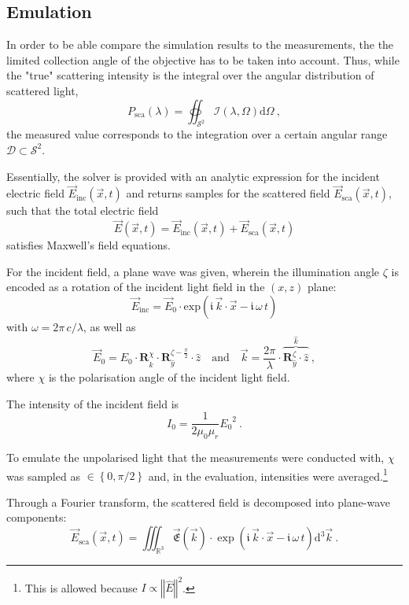 \documentclass[10pt]{article}
\begin{document}
\begin{multicols}{2}
\subsection*{Emulation}

In order to be able compare the simulation results to the measurements, the the limited collection angle of the objective has to be taken into account. 
Thus, while the "true" scattering intensity is the integral over the angular distribution of scattered light, 
$$
    P_\mathrm{sca}(\lambda) = \oiint_{\mathcal{S}^2} \mathcal{I}(\lambda, \Omega) \mathrm{d}\Omega \ ,
$$
the measured value corresponds to the integration over a certain angular range $\mathcal{D} \subset \mathcal{S}^2$. 

Essentially, the solver is provided with an analytic expression for the incident electric field
$\vec{E}_\mathrm{inc}(\vec{x},t)$
and returns samples for the scattered field
$\vec{E}_\mathrm{sca}(\vec{x},t)$, 
such that the total electric field 
$$\vec{E}(\vec{x},t) = \vec{E}_\mathrm{inc}(\vec{x},t) + \vec{E}_\mathrm{sca}(\vec{x},t) $$
satisfies Maxwell's field equations. 

For the incident field, a plane wave was given, wherein the illumination angle $\zeta$ is encoded as a rotation of the incident light field in the $(x,z)$ plane: 
$$
    \vec{E}_\mathrm{inc} = \vec{E}_0 \cdot \mathrm{exp}\left( \mathfrak{i} \, \vec{k} \cdot \vec{x} - \mathfrak{i} \, \omega \, t \right)
$$
with $\omega = 2\pi\,c/\lambda$, as well as
$$
    \vec{E}_0 = E_0 \cdot \boldsymbol{R}_{\hat{k}}^{\chi} \cdot \boldsymbol{R}_{\hat{y}}^{\zeta-\frac{\pi}{2}} \cdot \hat{z}
    \quad\text{and}\quad
    \vec{k} = \frac{2\pi}{\lambda} \cdot \overbrace{ \boldsymbol{R}_{\hat{y}}^{\zeta} \cdot \hat{z} }^{\hat{k}}
    \ ,
$$
where $\chi$ is the polarisation angle of the incident light field. %

The intensity of the incident field is 
$$I_0 = \frac{1}{2\mu_0 \mu_r} {E_0}^2 \ .$$
\cite{Griffiths-ED,MA}



To emulate the unpolarised light that the measurements were conducted with, $\chi$ was sampled as \mbox{$\in\left\lbrace0, \pi/2\right\rbrace$} and, in the evaluation, intensities were averaged.\footnote{This is allowed because $I\propto\left\Vert \hat{E} \right\Vert^2$.}

Through a Fourier transform, the scattered field is decomposed into plane-wave components:
$$
    \vec{E}_\mathrm{sca}(\vec{x},t) = \iiint_{\mathds{R}^3} \vec{\mathfrak{E}}(\vec{k}) \cdot \exp\!\left( \mathfrak{i}\,\vec{k}\cdot\vec{x} - \mathfrak{i}\,\omega\,t\right) \mathrm{d}^3 \vec{k} \ .
$$



\end{multicols}
\end{document}
